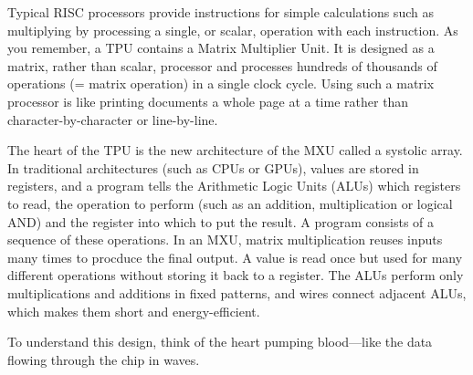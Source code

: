 Typical RISC processors provide instructions for simple calculations such as multiplying by processing a single, or scalar, operation with each instruction. As you remember, a TPU contains a Matrix Multiplier Unit. It is designed as a matrix, rather than scalar, processor and processes hundreds of thousands of operations (= matrix operation) in a single clock cycle. Using such a matrix processor is like printing documents a whole page at a time rather than character-by-character or line-by-line.



The heart of the TPU is the new architecture of the MXU called a systolic array. In traditional architectures (such as CPUs or GPUs), values are stored in registers, and a program tells the Arithmetic Logic Units (ALUs) which registers to read, the operation to perform (such as an addition, multiplication or logical AND) and the register into which to put the result. A program consists of a sequence of these operations. In an MXU, matrix multiplication reuses inputs many times to procduce the final output. A value is read once but used for many different operations without storing it back to a register. The ALUs perform only multiplications and additions in fixed patterns, and wires connect adjacent ALUs, which makes them short and energy-efficient.

To understand this design, think of the heart pumping blood---like the data flowing through the chip in waves.

